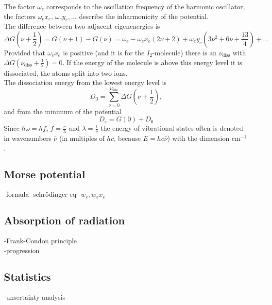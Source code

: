 The factor $\omega_e$ corresponds to the oscillation frequency of the harmonic oscillator, the factors $\omega_e x_e$, $\omega_e y_e, \ldots$ 
describe the inharmonicity of the potential. \\
The difference between two adjacent eigenenergies is
\begin{equation}
  \Delta G \left( \nu + \frac{1}{2} \right) = G(\nu + 1) - G(\nu) = \omega_e - \omega_e x_e (2\nu + 2) + \omega_e y_e \left( 3\nu^2 + 6 \nu + \frac{13}{4} \right) + \ldots 
\end{equation}
Provided that $\omega_e x_e$ is positive (and it is for the $I_2$-molecule) there is an 
$\nu_{\text{diss}}$ with $\Delta G (\nu_{\text{diss}} + \frac{1}{2}) = 0$. If the energy of the molecule is above this energy level it 
is dissociated, the atoms split into two ions. \\
The dissociation energy from the lowest energy level is
\begin{equation}
  D_0 = \sum_{\nu=0}^{\nu_{\text{diss}}} \Delta G \left( \nu + \frac{1}{2} \right),
\end{equation}
and from the minimum of the potential
\begin{equation}
  D_e = G(0) + D_0
\end{equation} 
Since $\hbar \omega = h f$, $f = \frac{c}{\lambda}$ and $\lambda = \frac{1}{\bar{\nu}}$ the energy of vibrational states often is denoted in 
wavenumbers $\bar{\nu}$ (in multiples of $h c$, because $E = hc\bar{\nu}$) with the dimension $\text{cm}^{-1}$.


\subsection{Morse potential}
-formula
-schrödinger eq
-$w_e, w_e x_e$

\subsection{Absorption of radiation}
-Frank-Condon principle \\
-progression

\subsection{Statistics}
-unsertainty analysis